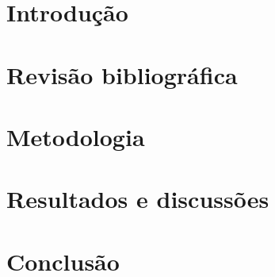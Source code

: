 




\frenchspacing 



\textual 

\chapter{Introdução}		


\chapter{Revisão bibliográfica}
\label{sec:revisao}


\chapter{Metodologia}
\label{sec:metodologia}


\chapter{Resultados e discussões}
\label{sec:resultados}


\chapter{Conclusão}
\label{sec:conclusoes}


\postextual



%	
%	
%	
%	
%	
%	
%	
%	
%	
	
%	
%


